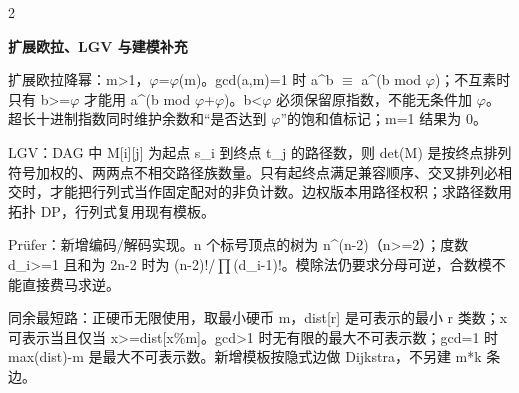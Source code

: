\documentclass[UTF8,fontset=fandol,a4paper,twoside]{ctexart}
\newcommand{\topic}[1]{\par\smallskip\textbf{#1}\par\nobreak}
\begin{document}
\begin{multicols}{2}
\topic{扩展欧拉、LGV 与建模补充}
扩展欧拉降幂：m>\allowbreak{}1，\ensuremath{\varphi}=\allowbreak{}\ensuremath{\varphi}(\allowbreak{}m)\allowbreak{}。gcd(\allowbreak{}a,\allowbreak{}m)\allowbreak{}=\allowbreak{}1 时 a\textasciicircum{}b \ensuremath{\equiv} a\textasciicircum{}(\allowbreak{}b mod \ensuremath{\varphi})\allowbreak{}；不互素时只有 b>\allowbreak{}=\allowbreak{}\ensuremath{\varphi} 才能用 a\textasciicircum{}(\allowbreak{}b mod \ensuremath{\varphi}+\allowbreak{}\ensuremath{\varphi})\allowbreak{}。b<\allowbreak{}\ensuremath{\varphi} 必须保留原指数，不能无条件加 \ensuremath{\varphi}。超长十进制指数同时维护余数和“是否达到 \ensuremath{\varphi}”的饱和值标记；m=\allowbreak{}1 结果为 0。\par\smallskip
LGV：DAG 中 M[\allowbreak{}i]\allowbreak{}[\allowbreak{}j]\allowbreak{} 为起点 s\_i 到终点 t\_j 的路径数，则 det(\allowbreak{}M)\allowbreak{} 是按终点排列符号加权的、两两点不相交路径族数量。只有起终点满足兼容顺序、交叉排列必相交时，才能把行列式当作固定配对的非负计数。边权版本用路径权积；求路径数用拓扑 DP，行列式复用现有模板。\par\smallskip
Prüfer：新增编码/\allowbreak{}解码实现。n 个标号顶点的树为 n\textasciicircum{}(\allowbreak{}n-\allowbreak{}2)\allowbreak{}（n>\allowbreak{}=\allowbreak{}2）；度数 d\_i>\allowbreak{}=\allowbreak{}1 且和为 2n-\allowbreak{}2 时为 (\allowbreak{}n-\allowbreak{}2)\allowbreak{}!/\allowbreak{}\ensuremath{\prod}(\allowbreak{}d\_i-\allowbreak{}1)\allowbreak{}!。模除法仍要求分母可逆，合数模不能直接费马求逆。\par\smallskip
同余最短路：正硬币无限使用，取最小硬币 m，dist[\allowbreak{}r]\allowbreak{} 是可表示的最小 r 类数；x 可表示当且仅当 x>\allowbreak{}=\allowbreak{}dist[\allowbreak{}x\%m]\allowbreak{}。gcd>\allowbreak{}1 时无有限的最大不可表示数；gcd=\allowbreak{}1 时 max(\allowbreak{}dist)\allowbreak{}-\allowbreak{}m 是最大不可表示数。新增模板按隐式边做 Dijkstra，不另建 m*k 条边。\par\smallskip

\end{multicols}
\end{document}
